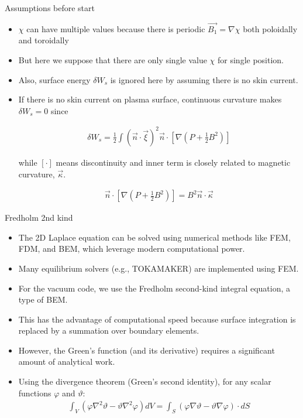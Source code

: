 \documentclass[8pt]{beamer}
\begin{document}
\begin{frame}{\color{white} Assumptions before start}
\begin{itemize}

    \item $\chi$ can have multiple values because there is periodic $\vec{B_1} = \nabla \chi$ both poloidally and toroidally 
    \item But here we suppose that there are only single value $\chi$ for single position. 
    \item Also, surface energy $\delta W_s$ is ignored here by assuming there is no skin current. 
    \item If there is no skin current on plasma surface, continuous curvature makes $\delta W_s = 0$ since
    
    \begin{align}
        \delta W_s = \frac{1}{2}\int ( \vec{n} \cdot \vec{\xi} )^2 \vec{n} \cdot \left[ \nabla \left( P + \frac{1}{2} B^2 \right)\right]
    \end{align}
    
    while $[ \cdot ]$ means discontinuity and inner term is closely related to magnetic curvature, $\vec{\kappa}$.
    
    \begin{align}
        \vec{n}\cdot \left[ \nabla\left( P + \frac{1}{2}B^2\right)\right] = 
        B^2 \vec{n}\cdot\vec{\kappa}
    \end{align}

\end{itemize}
\end{frame}

\begin{frame}{\color{white} Fredholm 2nd kind}
\begin{itemize}
    \item The 2D Laplace equation can be solved using numerical methods like FEM, FDM, and BEM, which leverage modern computational power.
    \item Many equilibrium solvers (e.g., TOKAMAKER) are implemented using FEM.
    \item For the vacuum code, we use the Fredholm second-kind integral equation, a type of BEM.
    \item This has the advantage of computational speed because surface integration is replaced by a summation over boundary elements.
    \item However, the Green's function (and its derivative) requires a significant amount of analytical work.
    \item Using the divergence theorem (Green's second identity), for any scalar functions $\varphi$ and $\vartheta$:
    \begin{align}
        \int_V \left( \varphi \nabla^2 \vartheta - \vartheta \nabla^2 \varphi \right) dV = \int_S \left( \varphi \nabla \vartheta - \vartheta \nabla \varphi \right) \cdot dS
    \end{align}
\end{itemize}
\end{frame}
\end{document}
